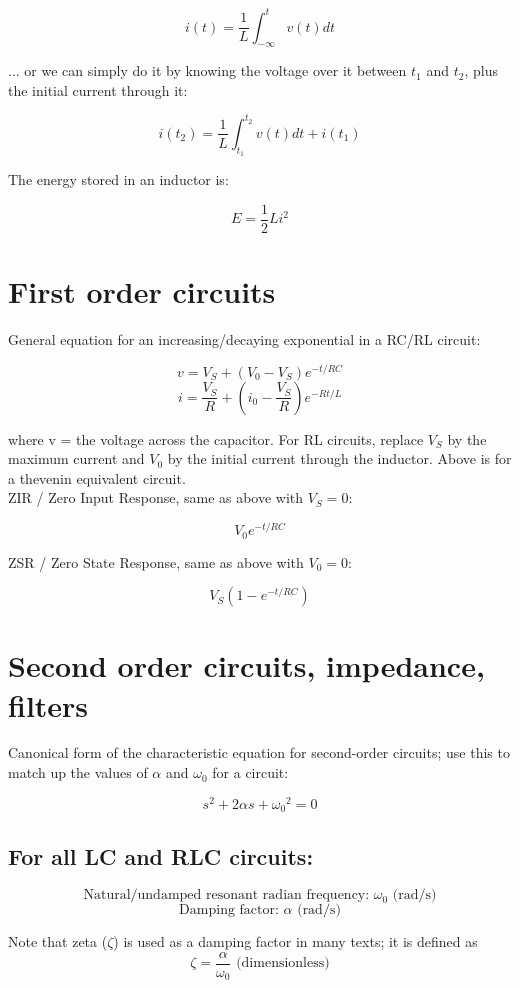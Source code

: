\documentclass[12pt,a4paper]{report}
\begin{document}
\[ i(t) = \frac{1}{L} \int_{-\infty}^t v(t) dt \]

... or we can simply do it by knowing the voltage over it between $t_1$ and $t_2$, plus the initial current through it:

\[ i(t_2) = \frac{1}{L} \int_{t_1}^{t_2} v(t) dt + i(t_1) \]

The energy stored in an inductor is:

\[ E = \frac{1}{2} L i^2 \]

\section{First order circuits}

General equation for an increasing/decaying exponential in a RC/RL circuit:

\[ v = V_S + (V_0 - V_S) e^{-t/RC} \]
\[ i = \frac{V_S}{R} + (i_0 - \frac{V_S}{R}) e^{-Rt/L} \]

where v = the voltage across the capacitor. For RL circuits, replace $V_S$ by the maximum current and $V_0$ by the initial current through the inductor. Above is for a thevenin equivalent circuit.\\

ZIR / Zero Input Response, same as above with $V_S = 0$:

\[ V_0 e^{-t/RC} \]

ZSR / Zero State Response, same as above with $V_0 = 0$:

\[ V_S(1 - e^{-t/RC}) \]

\newpage

\section{Second order circuits, impedance, filters}

Canonical form of the characteristic equation for second-order circuits; use this to match up the values of $\alpha$ and $\omega_0$ for a circuit:

\[ s^2 + 2\alpha s + {\omega_0}^2 = 0 \]

\subsection{For all LC and RLC circuits:}

\[ \text{Natural/undamped resonant radian frequency: } \omega_0 \text{ (rad/s)} \]
\[ \text{Damping factor: } \alpha \text{ (rad/s)} \]

Note that zeta ($\zeta$) is used as a damping factor in many texts; it is defined as
\[ \zeta = \frac{\alpha}{\omega_0} \text{ (dimensionless)} \]
\end{document}

